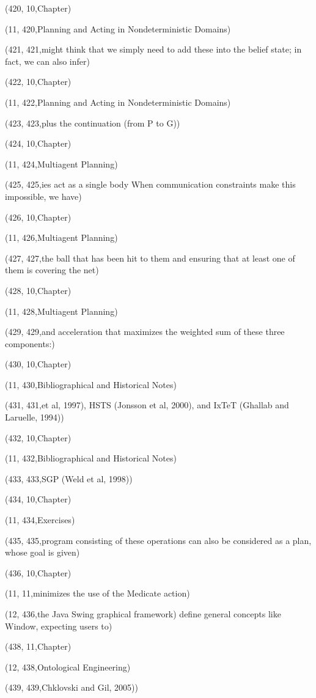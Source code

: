 (420, 10,Chapter)

(11, 420,Planning and Acting in Nondeterministic Domains)

(421, 421,might think that we simply need to add these into the belief state; in fact, we can also infer)

(422, 10,Chapter)

(11, 422,Planning and Acting in Nondeterministic Domains)

(423, 423,plus the continuation (from P to G))

(424, 10,Chapter)

(11, 424,Multiagent Planning)

(425, 425,ies act as a single body When communication constraints make this impossible, we have)

(426, 10,Chapter)

(11, 426,Multiagent Planning)

(427, 427,the ball that has been hit to them and ensuring that at least one of them is covering the net)

(428, 10,Chapter)

(11, 428,Multiagent Planning)

(429, 429,and acceleration that maximizes the weighted sum of these three components:)

(430, 10,Chapter)

(11, 430,Bibliographical and Historical Notes)

(431, 431,et al, 1997), HSTS (Jonsson et al, 2000), and IxTeT (Ghallab and Laruelle, 1994))

(432, 10,Chapter)

(11, 432,Bibliographical and Historical Notes)

(433, 433,SGP (Weld et al, 1998))

(434, 10,Chapter)

(11, 434,Exercises)

(435, 435,program consisting of these operations can also be considered as a plan, whose goal is given)

(436, 10,Chapter)

(11, 11,minimizes the use of the Medicate action)

(12, 436,the Java Swing graphical framework) deﬁne general concepts like Window, expecting users to)

(438, 11,Chapter)

(12, 438,Ontological Engineering)

(439, 439,Chklovski and Gil, 2005))

